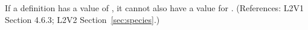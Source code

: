 If a \Species definition has a  value of
, it cannot also have a value for .
(References: L2V1 Section 4.6.3; L2V2 Section~\ref{sec:species}.)
